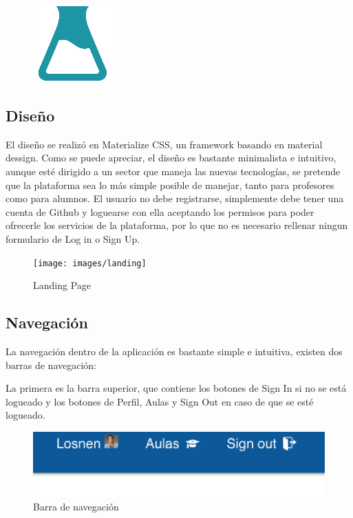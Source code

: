 \begin{figure}[!th]
\begin{center}
\includegraphics[scale=1.0]{images/probeta}
\end{center}
\end{figure}

\subsection{Diseño}
\label{3:5:1}

El diseño se realizó en Materialize CSS, un framework basando en material dessign. Como se puede apreciar, el diseño es bastante minimalista e intuitivo, aunque esté dirigido a un sector que maneja las nuevas tecnologías, se pretende que la plataforma sea lo más simple posible de manejar, tanto para profesores como para alumnos.
El usuario no debe registrarse, simplemente debe tener una cuenta de Github y loguearse con ella aceptando los permisos para poder ofrecerle los servicios de la plataforma, por lo que no es necesario rellenar ningun formulario de Log in o Sign Up.


\begin{figure}[!th]
\begin{center}
\texttt{[image: images/landing]}
\caption{Landing Page}
\label{fig:Landing page}
\end{center}
\end{figure}

\newpage

\subsection{Navegación}
\label{3:5:2}

La navegación dentro de la aplicación es bastante simple e intuitiva, existen dos barras de navegación:

La primera es la barra superior, que contiene los botones de Sign In si no se está logueado y los botones de Perfil, Aulas y Sign Out en caso de que se esté logueado.

\begin{figure}[!th]
\begin{center}
\includegraphics[scale=0.8]{images/nav}
\caption{Barra de navegación}
\label{fig:Barra de navegacion}
\end{center}
\end{figure}

